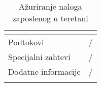 \documentclass[../main.tex]{subfiles}
\begin{document}
\begin{longtable}{| p{} | p{} |}
\begin{itemize}
    \end{itemize}\\
\hline
    Podtokovi & /\\
\hline
    Specijalni zahtevi & /\\
\hline
    Dodatne informacije & /\\
\hline
\caption{Ažuriranje naloga zaposlenog u teretani} %
\end{longtable}
\end{document}
